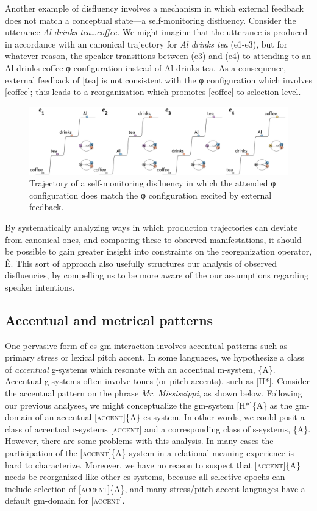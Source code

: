   Another example of disfluency involves a mechanism in which external feedback does not match a conceptual state—a self-monitoring disfluency. Consider the utterance \textit{Al drinks tea…coffee.} We might imagine that the utterance is produced in accordance with an canonical trajectory for \textit{Al drinks tea} (e1-e3), but for whatever reason, the speaker transitions between (e3) and (e4) to attending to an {\textbar}Al drinks coffee{\textbar} φ configuration instead of {\textbar}Al drinks tea{\textbar}. As a consequence, external feedback of [tea] is not consistent with the φ configuration which involves [coffee]; this leads to a reorganization which promotes [coffee] to selection level.

  
\begin{figure}
\includegraphics[width=\textwidth]{figures/Tilsen-img62.png}
\caption{Trajectory of a self-monitoring disfluency in which the attended φ configuration does match the φ configuration excited by external feedback.}
\label{fig:4:12}
\end{figure}
 

  By systematically analyzing ways in which production trajectories can deviate from canonical ones, and comparing these to observed manifestations, it should be possible to gain greater insight into constraints on the reorganization operator, Ê. This sort of approach also usefully structures our analysis of observed disfluencies, by compelling us to be more aware of the our assumptions regarding speaker intentions.

\subsection{Accentual and metrical patterns}

One pervasive form of cs-gm interaction involves accentual patterns such as primary stress or lexical pitch accent. In some languages, we hypothesize a class of \textit{accentual} g-systems which resonate with an accentual m-system, \{A\}. Accentual g-systems often involve tones (or pitch accents), such as [H*]. Consider the accentual pattern on the phrase \textit{Mr}. \textit{Mississippi}, as shown below. Following our previous analyses, we might conceptualize the gm-system [H*]\{A\} as the gm-domain of an accentual [\textsc{accent}]\{A\} cs-system. In other words, we could posit a class of accentual c-systems [\textsc{accent}] and a corresponding class of s-systems, \{A\}. However, there are some problems with this analysis. In many cases the participation of the [\textsc{accent}]\{A\} system in a relational meaning experience is hard to characterize. Moreover, we have no reason to suspect that [\textsc{accent}]\{A\} needs be reorganized like other cs-systems, because all selective epochs can include selection of [\textsc{accent}]\{A\}, and many stress/pitch accent languages have a default gm-domain for [\textsc{accent}].

